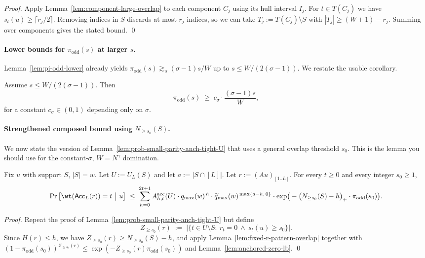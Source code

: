 \begin{proof}
Apply Lemma~\ref{lem:component-large-overlap} to each component $C_j$ using its hull interval $I_j$.
For $t\in T(C_j)$ we have $s_t(u)\ge \lceil r_j/2\rceil$.
Removing indices in $S$ discards at most $r_j$ indices, so we can take $T_j:=T(C_j)\setminus S$ with
$|T_j|\ge (W+1)-r_j$.
Summing over components gives the stated bound.
\qed
\end{proof}

\paragraph{Lower bounds for $\pi_{\mathrm{odd}}(s)$ at larger $s$.}
Lemma~\ref{lem:pi-odd-lower} already yields $\pi_{\mathrm{odd}}(s)\gtrsim_\sigma (\sigma-1)s/W$ up to
$s\le W/(2(\sigma-1))$.
We restate the usable corollary.

\begin{corollary}
\label{cor:pi-odd-linear}
Assume $s\le W/(2(\sigma-1))$.
Then
\[
\pi_{\mathrm{odd}}(s)\;\ge\; c_\sigma\cdot \frac{(\sigma-1)s}{W},
\]
for a constant $c_\sigma\in(0,1)$ depending only on $\sigma$.
\end{corollary}

\paragraph{Strengthened composed bound using $N_{\ge s_0}(S)$.}
We now state the version of Lemma~\ref{lem:prob-small-parity-anch-tight-U} that uses a general overlap threshold $s_0$.
This is the lemma you should use for the constant-$\sigma$, $W=N^\gamma$ domination.

\begin{lemma}
\label{lem:prob-small-parity-anch-threshold}
Fix $u$ with support $S$, $|S|=w$.
Let $U:=U_L(S)$ and let $a:=|S\cap[L]|$.
Let $r:=(Au)_{[1..L]}$.
For every $t\ge 0$ and every integer $s_0\ge 1$,
\[
\Pr\big[\wt({\sf Acc}_{L}(r))=t\ \big|\ u\big]
\;\le\;
\sum_{h=0}^{2t+1}
A^{\mathrm{acc}}_{h,t}(U)\cdot
q_{\max}(w)^{\,h}\cdot
\widetilde q_{\max}(w)^{\,\max\{a-h,\,0\}}\cdot
\exp\!\big(-\big(N_{\ge s_0}(S)-h\big)_+\cdot \pi_{\mathrm{odd}}(s_0)\big).
\]
\end{lemma}

\begin{proof}
Repeat the proof of Lemma~\ref{lem:prob-small-parity-anch-tight-U} but define
\[
Z_{\ge s_0}(r)\;:=\;|\{t\in U\setminus S:\ r_t=0\ \wedge\ s_t(u)\ge s_0\}|.
\]
Since $H(r)\le h$, we have $Z_{\ge s_0}(r)\ge N_{\ge s_0}(S)-h$, and apply Lemma~\ref{lem:fixed-r-pattern-overlap}
together with $(1-\pi_{\mathrm{odd}}(s_0))^{Z_{\ge s_0}(r)}\le \exp(-Z_{\ge s_0}(r)\pi_{\mathrm{odd}}(s_0))$ and
Lemma~\ref{lem:anchored-zero-lb}.
\qed
\end{proof}

